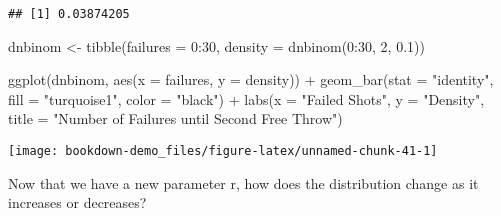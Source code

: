 \documentclass[
]{book}
\newenvironment{Shaded}{\begin{snugshade}}{\end{snugshade}}
\newcommand{\AttributeTok}[1]{\textcolor[rgb]{0.77,0.63,0.00}{#1}}
\newcommand{\DecValTok}[1]{\textcolor[rgb]{0.00,0.00,0.81}{#1}}
\newcommand{\FloatTok}[1]{\textcolor[rgb]{0.00,0.00,0.81}{#1}}
\newcommand{\FunctionTok}[1]{\textcolor[rgb]{0.00,0.00,0.00}{#1}}
\newcommand{\NormalTok}[1]{#1}
\newcommand{\OtherTok}[1]{\textcolor[rgb]{0.56,0.35,0.01}{#1}}
\newcommand{\SpecialCharTok}[1]{\textcolor[rgb]{0.00,0.00,0.00}{#1}}
\newcommand{\StringTok}[1]{\textcolor[rgb]{0.31,0.60,0.02}{#1}}
\begin{document}
\begin{verbatim}
## [1] 0.03874205
\end{verbatim}

\begin{Shaded}
\begin{Highlighting}[]
\NormalTok{dnbinom }\OtherTok{\textless{}{-}} \FunctionTok{tibble}\NormalTok{(}\AttributeTok{failures =} \DecValTok{0}\SpecialCharTok{:}\DecValTok{30}\NormalTok{,}
                  \AttributeTok{density =} \FunctionTok{dnbinom}\NormalTok{(}\DecValTok{0}\SpecialCharTok{:}\DecValTok{30}\NormalTok{, }\DecValTok{2}\NormalTok{, }\FloatTok{0.1}\NormalTok{))}

\FunctionTok{ggplot}\NormalTok{(dnbinom, }\FunctionTok{aes}\NormalTok{(}\AttributeTok{x =}\NormalTok{ failures, }\AttributeTok{y =}\NormalTok{ density)) }\SpecialCharTok{+}
  \FunctionTok{geom\_bar}\NormalTok{(}\AttributeTok{stat =} \StringTok{"identity"}\NormalTok{, }\AttributeTok{fill =} \StringTok{"turquoise1"}\NormalTok{, }\AttributeTok{color =} \StringTok{"black"}\NormalTok{) }\SpecialCharTok{+}
  \FunctionTok{labs}\NormalTok{(}\AttributeTok{x =} \StringTok{"Failed Shots"}\NormalTok{, }\AttributeTok{y =} \StringTok{"Density"}\NormalTok{, }
       \AttributeTok{title =} \StringTok{"Number of Failures until Second Free Throw"}\NormalTok{)}
\end{Highlighting}
\end{Shaded}

\begin{center}\texttt{[image: bookdown-demo\_files/figure-latex/unnamed-chunk-41-1]} \end{center}

Now that we have a new parameter r, how does the distribution change as it increases or decreases?
\end{document}
